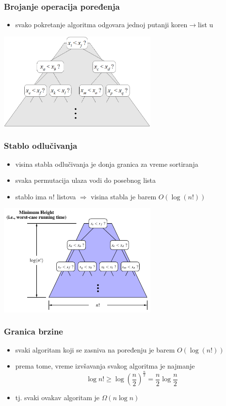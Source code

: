 \documentclass[compress]{beamer}
\begin{document}
\begin{frame}[fragile]
  \frametitle{Brojanje operacija poređenja}
  \begin{itemize}
    \item svako pokretanje algoritma odgovara jednoj putanji koren$\rightarrow$list u 
  \end{itemize}
  \begin{center}
    \includegraphics[width=8cm]{asp-12-pic29.png}
  \end{center}
\end{frame}

\begin{frame}[fragile]
  \frametitle{Stablo odlučivanja}
  \begin{itemize}
    \item visina stabla odlučivanja je donja granica za vreme sortiranja
    \item svaka permutacija ulaza vodi do posebnog lista
    \item stablo ima $n!$ listova $\Rightarrow$ visina stabla je barem $O(\log(n!))$
  \end{itemize}
  \begin{center}
    \includegraphics[width=8cm]{asp-12-pic30.pdf}
  \end{center}
\end{frame}

\begin{frame}[fragile]
  \frametitle{Granica brzine}
  \begin{itemize}
    \item svaki algoritam koji se zasniva na poređenju je barem $O(\log(n!))$
    \item prema tome, vreme izvšavanja svakog algoritma je najmanje
    $$\log n! \geq \log \left(\frac{n}{2}\right)^{\frac{n}{2}} = \frac{n}{2}\log\frac{n}{2}$$
    \item tj. svaki ovakav algoritam je $\Omega(n\log n)$
  \end{itemize}
\end{frame}
\end{document}
